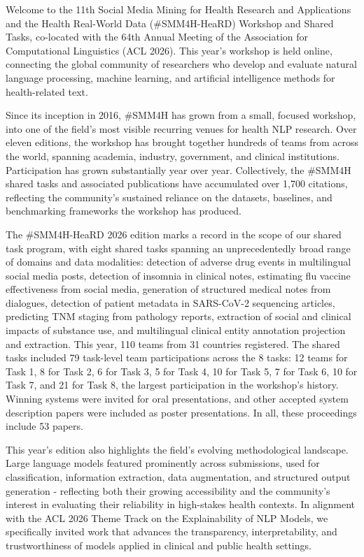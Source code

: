 Welcome to the 11th Social Media Mining for Health Research and Applications and the Health Real-World Data (\#SMM4H-HeaRD) Workshop and Shared Tasks, co-located with the 64th Annual Meeting of the Association for Computational Linguistics (ACL 2026). This year’s workshop is held online, connecting the global community of researchers who develop and evaluate natural language processing, machine learning, and artificial intelligence methods for health-related text.
\par\vspace{1em}

Since its inception in 2016, \#SMM4H has grown from a small, focused workshop, into one of the field’s most visible recurring venues for health NLP research. Over eleven editions, the workshop has brought together hundreds of teams from across the world, spanning academia, industry, government, and clinical institutions. Participation has grown substantially year over year. Collectively, the \#SMM4H shared tasks and associated publications have accumulated over 1,700 citations, reflecting the community’s sustained reliance on the datasets, baselines, and benchmarking frameworks the workshop has produced.
\par\vspace{1em}

The \#SMM4H-HeaRD 2026 edition marks a record in the scope of our shared task program, with eight shared tasks spanning an unprecedentedly broad range of domains and data modalities: detection of adverse drug events in multilingual social media posts, detection of insomnia in clinical notes, estimating flu vaccine effectiveness from social media, generation of structured medical notes from dialogues, detection of patient metadata in SARS-CoV-2 sequencing articles, predicting TNM staging from pathology reports, extraction of social and clinical impacts of substance use, and multilingual clinical entity annotation projection and extraction. This year, 110 teams from 31 countries registered. The shared tasks included 79 task-level team participations across the 8 tasks: 12 teams for Task 1, 8 for Task 2, 6 for Task 3, 5 for Task 4, 10 for Task 5, 7 for Task 6, 10 for Task 7, and 21 for Task 8, the largest participation in the workshop's history. Winning systems were invited for oral presentations, and other accepted system description papers were included as poster presentations. In all, these proceedings include 53 papers.

\par\vspace{1em}
This year’s edition also highlights the field’s evolving methodological landscape. Large language models featured prominently across submissions, used for classification, information extraction, data augmentation, and structured output generation - reflecting both their growing accessibility and the community’s interest in evaluating their reliability in high-stakes health contexts. In alignment with the ACL 2026 Theme Track on the Explainability of NLP Models, we specifically invited work that advances the transparency, interpretability, and trustworthiness of models applied in clinical and public health settings.

